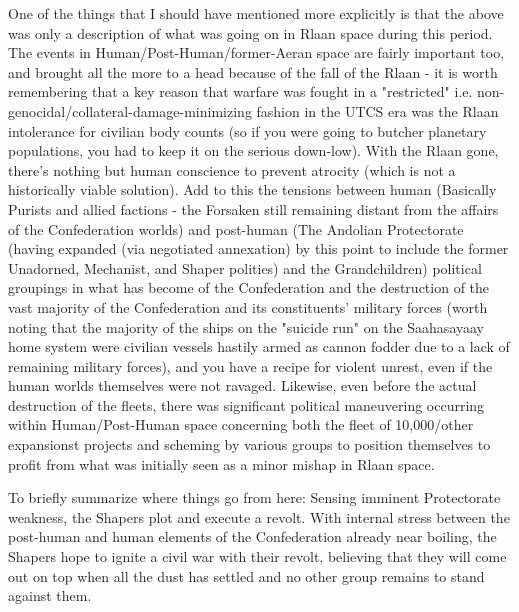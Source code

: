One of the things that I should have mentioned more explicitly is that the above was only a description of what was going on in Rlaan space during this period. The events in Human/Post-Human/former-Aeran space are fairly important too, and brought all the more to a head because of the fall of the Rlaan - it is worth remembering that a key reason that warfare was fought in a "restricted" i.e. non-genocidal/collateral-damage-minimizing fashion in the UTCS era was the Rlaan intolerance for civilian body counts (so if you were going to butcher planetary populations, you had to keep it on the serious down-low). With the Rlaan gone, there's nothing but human conscience to prevent atrocity (which is not a historically viable solution). Add to this the tensions between human (Basically Purists and allied factions - the Forsaken still remaining distant from the affairs of the Confederation worlds) and post-human (The Andolian Protectorate (having expanded (via negotiated annexation) by this point to include the former Unadorned, Mechanist, and Shaper polities) and the Grandchildren) political groupings in what has become of the Confederation and the destruction of the vast majority of the Confederation and its constituents' military forces (worth noting that the majority of the ships on the "suicide run" on the Saahasayaay home system were civilian vessels hastily armed as cannon fodder due to a lack of remaining military forces), and you have a recipe for violent unrest, even if the human worlds themselves were not ravaged. Likewise, even before the actual destruction of the fleets, there was significant political maneuvering occurring within Human/Post-Human space concerning both the fleet of 10,000/other expansionst projects and scheming by various groups to position themselves to profit from what was initially seen as a minor mishap in Rlaan space.

To briefly summarize where things go from here:
Sensing imminent Protectorate weakness, the Shapers plot and execute a revolt. With internal stress between the post-human and human elements of the Confederation already near boiling, the Shapers hope to ignite a civil war with their revolt, believing that they will come out on top when all the dust has settled and no other group remains to stand against them.

